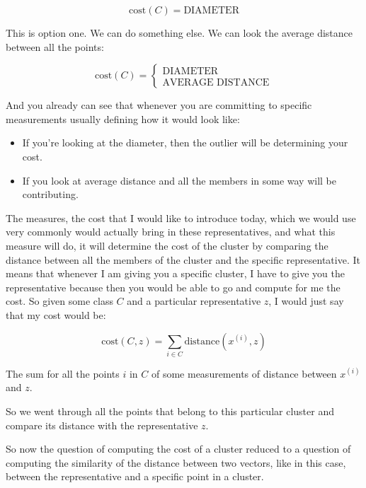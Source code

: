 \documentclass[a4paper, 12pt]{article}
\begin{document}
\begin{equation}
\text{cost}(C) = \text{DIAMETER}
\end{equation}

This is option one. We can do something else. We can look the average distance
between all the points:

\begin{equation}
\text{cost}(C) = \left\{ \begin{array}{l}
                          \text{DIAMETER} \\
                          \text{AVERAGE DISTANCE}
                         \end{array} \right.
\end{equation}

And you already can see that whenever you are committing to specific
measurements usually defining how it would look like:
\begin{itemize}
\item If you're looking at the diameter, then the outlier will be determining your
cost.
\item If you look at average distance and all the members in some way will be
contributing.
\end{itemize}

The measures, the cost that I would like to introduce today, which we would use
very commonly would actually bring in these representatives, and what this
measure will do, it will determine the cost of the cluster by comparing the
distance between all the members of the cluster and the specific representative.
It means that whenever I am giving you a specific cluster, I have to give you
the representative because then you would be able to go and compute for me the
cost. So given some class \(C\) and a particular representative \(z\), I would
just say that my cost would be:

\begin{equation}
\text{cost}(C,z) = \sum_{i \in C} \text{distance}(x^{(i)}, z)
\end{equation}

 The sum for all the points \(i\) in \(C\) of some measurements of distance
between \(x^{(i)}\) and \(z\).

So we went through all the points that belong to this particular cluster and
compare its distance with the representative \(z\).

So now the question of computing the cost of a cluster reduced to a question of
computing the similarity of the distance between two vectors, like in this case,
between the representative and a specific point in a cluster.
\end{document}
